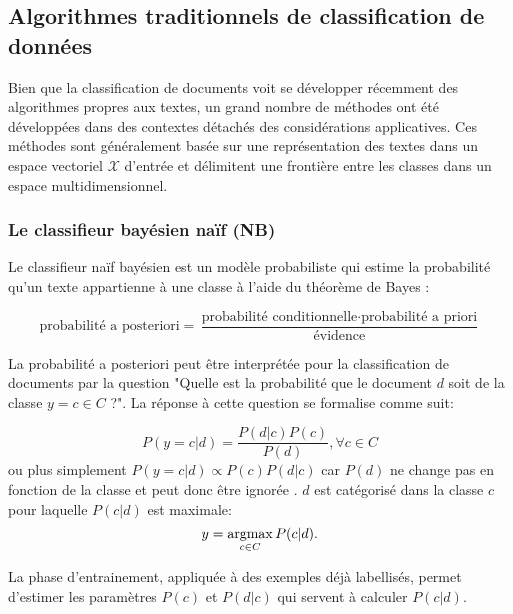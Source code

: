 \subsection{Algorithmes traditionnels de classification de données}
Bien que la classification de documents voit se développer récemment des algorithmes propres aux textes, un grand nombre de méthodes ont été développées dans des contextes détachés des considérations applicatives. Ces méthodes sont généralement basée sur une représentation des textes dans un espace vectoriel $\mathcal{X}$ d'entrée et délimitent une frontière entre les classes dans un espace multidimensionnel.

\subsubsection{Le classifieur bayésien naïf (NB)}
Le classifieur naïf bayésien \citep{duda1973patternclass} est un modèle probabiliste qui estime la probabilité qu'un texte appartienne à une classe à l'aide du théorème de Bayes \citep{raschka2014naivebayes}:

\[\text{probabilité a posteriori} = \frac{\text{probabilité conditionnelle} \cdot \text{probabilité a priori}}{\text{évidence}}\]

La probabilité a posteriori peut être interprétée pour la classification de documents par la question "Quelle est la probabilité que le document $d$ soit de la classe $y=c \in C$ ?". La réponse à cette question se formalise comme suit:

\[P(y=c \vert d) = \frac{P(d \vert c)P(c)}{P(d)}, \forall c \in C \]
ou plus simplement $P(y = c \vert d) \propto P(c)P(d \vert c)$ car $P(d)$ ne change pas en fonction de la classe et peut donc être ignorée \citep{rish2001nb_study}. $d$ est catégorisé dans la classe $c$ pour laquelle $P(c \vert d)$ est maximale: \[y = \mathop{\mathrm{argmax}}\limits_{c \in C} P(c \vert d).\]

 La phase d'entrainement, appliquée à des exemples déjà labellisés, permet d'estimer les paramètres $P(c)$ et $P(d \vert c)$ qui servent à calculer $P(c \vert d)$.

